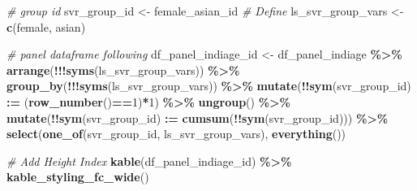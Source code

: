 \documentclass[
]{book}
\newenvironment{Shaded}{\begin{snugshade}}{\end{snugshade}}
\newcommand{\CommentTok}[1]{\textcolor[rgb]{0.56,0.35,0.01}{\textit{#1}}}
\newcommand{\DecValTok}[1]{\textcolor[rgb]{0.00,0.00,0.81}{#1}}
\newcommand{\ErrorTok}[1]{\textcolor[rgb]{0.64,0.00,0.00}{\textbf{#1}}}
\newcommand{\KeywordTok}[1]{\textcolor[rgb]{0.13,0.29,0.53}{\textbf{#1}}}
\newcommand{\NormalTok}[1]{#1}
\newcommand{\OperatorTok}[1]{\textcolor[rgb]{0.81,0.36,0.00}{\textbf{#1}}}
\newcommand{\StringTok}[1]{\textcolor[rgb]{0.31,0.60,0.02}{#1}}
\begin{document}
\begin{Shaded}
\begin{Highlighting}[]
\CommentTok{\# group id}
\NormalTok{svr\_group\_id \textless{}{-}}\StringTok{ \textquotesingle{}female\_asian\_id\textquotesingle{}}
\CommentTok{\# Define}
\NormalTok{ls\_svr\_group\_vars \textless{}{-}}\StringTok{ }\KeywordTok{c}\NormalTok{(}\StringTok{\textquotesingle{}female\textquotesingle{}}\NormalTok{, }\StringTok{\textquotesingle{}asian\textquotesingle{}}\NormalTok{)}

\CommentTok{\# panel dataframe following}
\NormalTok{df\_panel\_indiage\_id \textless{}{-}}\StringTok{ }\NormalTok{df\_panel\_indiage }\OperatorTok{\%\textgreater{}\%}
\StringTok{  }\KeywordTok{arrange}\NormalTok{(}\OperatorTok{!!!}\KeywordTok{syms}\NormalTok{(ls\_svr\_group\_vars)) }\OperatorTok{\%\textgreater{}\%}
\StringTok{  }\KeywordTok{group\_by}\NormalTok{(}\OperatorTok{!!!}\KeywordTok{syms}\NormalTok{(ls\_svr\_group\_vars)) }\OperatorTok{\%\textgreater{}\%}
\StringTok{  }\KeywordTok{mutate}\NormalTok{(}\OperatorTok{!!}\KeywordTok{sym}\NormalTok{(svr\_group\_id) }\OperatorTok{:}\ErrorTok{=}\StringTok{ }\NormalTok{(}\KeywordTok{row\_number}\NormalTok{()}\OperatorTok{==}\DecValTok{1}\NormalTok{)}\OperatorTok{*}\DecValTok{1}\NormalTok{) }\OperatorTok{\%\textgreater{}\%}
\StringTok{  }\KeywordTok{ungroup}\NormalTok{() }\OperatorTok{\%\textgreater{}\%}
\StringTok{  }\KeywordTok{mutate}\NormalTok{(}\OperatorTok{!!}\KeywordTok{sym}\NormalTok{(svr\_group\_id) }\OperatorTok{:}\ErrorTok{=}\StringTok{ }\KeywordTok{cumsum}\NormalTok{(}\OperatorTok{!!}\KeywordTok{sym}\NormalTok{(svr\_group\_id))) }\OperatorTok{\%\textgreater{}\%}
\StringTok{  }\KeywordTok{select}\NormalTok{(}\KeywordTok{one\_of}\NormalTok{(svr\_group\_id, ls\_svr\_group\_vars), }\KeywordTok{everything}\NormalTok{())}

\CommentTok{\# Add Height Index}
\KeywordTok{kable}\NormalTok{(df\_panel\_indiage\_id) }\OperatorTok{\%\textgreater{}\%}
\StringTok{  }\KeywordTok{kable\_styling\_fc\_wide}\NormalTok{()}
\end{Highlighting}
\end{Shaded}
\end{document}
